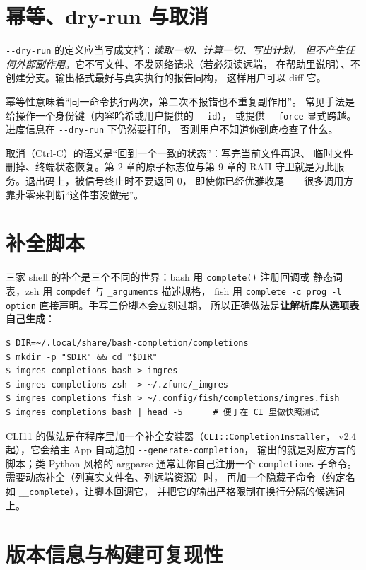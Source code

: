 \documentclass[12pt,a4paper,fontset=fandol]{ctexbook}
\newcommand{\Fn}[1]{\texttt{#1()}}
\newcommand{\Tp}[1]{\texttt{#1}}
\newcommand{\Opt}[1]{\texttt{-\/-#1}}
\begin{document}
\section{幂等、dry-run 与取消}

\Opt{dry-run} 的定义应当写成文档：\emph{读取一切、计算一切、写出计划，
但不产生任何外部副作用}。它不写文件、不发网络请求（若必须读远端，
在帮助里说明）、不创建分支。输出格式最好与真实执行的报告同构，
这样用户可以 diff 它。

幂等性意味着``同一命令执行两次，第二次不报错也不重复副作用''。
常见手法是给操作一个身份键（内容哈希或用户提供的 \Opt{id}），
或提供 \Opt{force} 显式跨越。进度信息在 \Opt{dry-run} 下仍然要打印，
否则用户不知道你到底检查了什么。

取消（Ctrl-C）的语义是``回到一个一致的状态''：写完当前文件再退、
临时文件删掉、终端状态恢复。第 2 章的原子标志位与第 9 章的 RAII
守卫就是为此服务。退出码上，被信号终止时不要返回 0，
即使你已经优雅收尾——很多调用方靠非零来判断``这件事没做完''。

\section{补全脚本}

三家 shell 的补全是三个不同的世界：bash 用 \Fn{complete} 注册回调或
静态词表，zsh 用 \Tp{compdef} 与 \Tp{\_arguments} 描述规格，
fish 用 \Tp{complete -c prog -l option} 直接声明。手写三份脚本会立刻过期，
所以正确做法是\textbf{让解析库从选项表自己生成}：

\begin{lstlisting}[style=shellstyle,caption={补全脚本的产物链}]
$ DIR=~/.local/share/bash-completion/completions
$ mkdir -p "$DIR" && cd "$DIR"
$ imgres completions bash > imgres
$ imgres completions zsh  > ~/.zfunc/_imgres
$ imgres completions fish > ~/.config/fish/completions/imgres.fish
$ imgres completions bash | head -5      # 便于在 CI 里做快照测试
\end{lstlisting}

CLI11 的做法是在程序里加一个补全安装器（\Tp{CLI::CompletionInstaller}，
v2.4 起），它会给主 App 自动追加 \Opt{generate-completion}，
输出的就是对应方言的脚本；类 Python 风格的 argparse 通常让你自己注册一个
\Tp{completions} 子命令。需要动态补全（列真实文件名、列远端资源）时，
再加一个隐藏子命令（约定名如 \Tp{\_\_complete}），让脚本回调它，
并把它的输出严格限制在换行分隔的候选词上。

\section{版本信息与构建可复现性}
\end{document}
